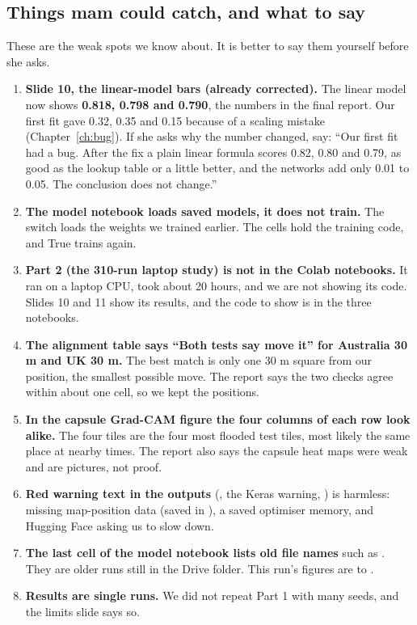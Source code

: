 \subsection{Things mam could catch, and what to say}\label{sec:risks}
These are the weak spots we know about. It is better to say them yourself before she asks.
\begin{enumerate}
\item \textbf{Slide 10, the linear-model bars (already corrected).} The linear model now shows \textbf{0.818, 0.798 and 0.790}, the numbers in the final report. Our first fit gave 0.32, 0.35 and 0.15 because of a scaling mistake (Chapter~\ref{ch:bug}). If she asks why the number changed, say: ``Our first fit had a bug. After the fix a plain linear formula scores 0.82, 0.80 and 0.79, as good as the lookup table or a little better, and the networks add only 0.01 to 0.05. The conclusion does not change.''
\item \textbf{The model notebook loads saved models, it does not train.} The switch  loads the weights we trained earlier. The  cells hold the training code, and True trains again.
\item \textbf{Part 2 (the 310-run laptop study) is not in the Colab notebooks.} It ran on a laptop CPU, took about 20 hours, and we are not showing its code. Slides 10 and 11 show its results, and the code to show is in the three notebooks.
\item \textbf{The alignment table says ``Both tests say move it'' for Australia 30 m and UK 30 m.} The best match is only one 30 m square from our position, the smallest possible move. The report says the two checks agree within about one cell, so we kept the positions.
\item \textbf{In the capsule Grad-CAM figure the four columns of each row look alike.} The four tiles are the four most flooded test tiles, most likely the same place at nearby times. The report also says the capsule heat maps were weak and are pictures, not proof.
\item \textbf{Red warning text in the outputs} (, the Keras  warning, ) is harmless: missing map-position data (saved in ), a saved optimiser memory, and Hugging Face asking us to slow down.
\item \textbf{The last cell of the model notebook lists old file names} such as . They are older runs still in the Drive folder. This run's figures are  to .
\item \textbf{Results are single runs.} We did not repeat Part 1 with many seeds, and the limits slide says so.
\end{enumerate}

